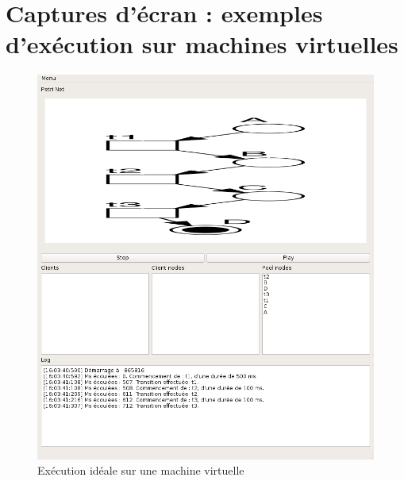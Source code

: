 	\chapter{Captures d'écran : exemples d'exécution sur machines virtuelles}
	\begin{figure}
		\centering
		\includegraphics[scale=0.55]{images/resultats/vm/serverVMideal.png}
		
		\caption{Exécution idéale sur une machine virtuelle}
		\label{fig.executionTheoriqueVM}
	\end{figure}

